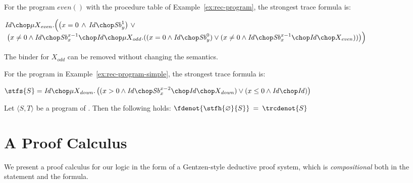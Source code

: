 \documentclass[a4paper,numberwithinsect]{lipics-v2021}
\begin{document}
\begin{example}\label{ex:stf-rec}
  For the program $\mathit{even}()$ with the procedure table of
  Example~\ref{ex:rec-program}, the strongest trace formula is:

  \noindent
  $
  \begin{array}{@{}l@{}l}
    & \mathit{Id} \chop \mu X_\mathit{even}.\Bigl( 
    \bigl(x = 0 \,\land\,\mathit{Id} \chop \mathit{Sb}^{1}_{y}\bigl)\ \lor\\ 
   & \;\bigl(x \neq 0 \land
     \mathit{Id} \chop \mathit{Sb}^{x-1}_{x} \chop \mathit{Id} \chop \mu X_{\mathit{odd}}.((x = 0 \land \mathit{Id} \chop \mathit{Sb}^{0}_{y}) \lor
  (x \neq 0 \land 
     \mathit{Id} \chop \mathit{Sb}^{x-1}_{x} \chop\mathit{Id}\chop X_{\mathit{even}}))\bigr)\Bigr)
\end{array}
$

\noindent The binder for $X_{odd}$ can be removed without changing the
semantics.
\end{example}

\begin{example}\label{ex:stf-rec-simple}
  For the program in Example~\ref{ex:rec-program-simple}, the
  strongest trace formula is:\smallskip
  
  \noindent$\stfs{S} = 
      \mathit{Id} \chop 
      \mu X_\mathit{down}.\, 
          \bigl((x > 0 \land \mathit{Id} \chop 
                 \mathit{Sb}^{x-2}_x 
                 \chop \mathit{Id} \chop X_\mathit{down})
                \lor
                 (x \leq 0 \land \mathit{Id}\chop\mathit{Id})
                  \bigr)$ 
\end{example}

\begin{theorem}
\label{thm:stf-characterisation-rec}
Let $\langle S,T\rangle$ be a program of \Rec. Then the following holds:
%
$ \fdenot{\stfh{\varnothing}{S}} \>=\> \trcdenot{S} $
\end{theorem}

\section{A Proof Calculus}
\label{sec:proof-calculus}

We present a proof calculus for our logic in the form of a
Gentzen-style deductive proof system, which is \emph{compositional}
both in the statement and the formula.
\end{document}
